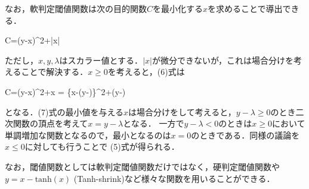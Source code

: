 なお，軟判定閾値関数は次の目的関数$C$を最小化する$x$を求めることで導出できる．


C=(y-x)^2+\lambda |x|


ただし，$x, y, \lambda$はスカラー値とする．$|x|$が微分できないが，これは場合分けを考えることで解決する．$x\geq 0$を考えると，(6)式は


C=(y-x)^2+\lambda x = \{x-(y-\lambda)\}^2+\lambda(y-\lambda)


となる．(7)式の最小値を与える$x$は場合分けをして考えると，$y-\lambda\geq0$のとき二次関数の頂点を考えて$x=y-\lambda$となる． 一方で$y-\lambda<0$のときは$x\geq0$において単調増加な関数となるので，最小となるのは$x=0$のときである．同様の議論を$x\leq0$に対しても行うことで (5)式が得られる．

なお，閾値関数としては軟判定閾値関数だけではなく，硬判定閾値関数や$y=x - \text{tanh}(x)$ (Tanh-shrink)など様々な関数を用いることができる．
